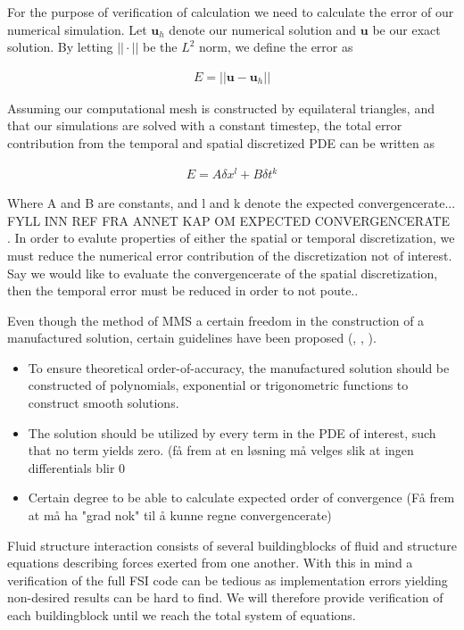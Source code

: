 For the purpose of verification of calculation we need to calculate the error of our numerical simulation. Let $\mathbf{u}_h$ denote our numerical solution and $\mathbf{u}$ be our exact solution. By letting $|| \cdot || $ be the  $L^2$ norm, we define the error as

\begin{align*}
E = ||\mathbf{u} - \mathbf{u}_h  ||
\end{align*}

Assuming our computational mesh is constructed by equilateral triangles, and that our simulations are solved with a constant timestep, the total error contribution from the temporal and spatial 
discretized PDE can be written as

\begin{align*}
E = A \delta x^l + B \delta t^k
\end{align*}


Where A and B are constants, and l and k denote the expected convergencerate... FYLL INN REF FRA ANNET KAP OM EXPECTED CONVERGENCERATE \\. In order to evalute properties of either the spatial or temporal discretization, we must reduce the numerical error contribution of the discretization not of interest. Say we would like to evaluate the convergencerate of the spatial discretization, then the temporal error must be reduced in order to not poute.. 

Even though the method of MMS a certain freedom in the construction of a manufactured solution, certain guidelines have been proposed  (\cite{Steinberg1985}, \cite{Biggs}, \cite{Roache2002} ). 

\begin{itemize}
\item To ensure theoretical order-of-accuracy, the manufactured solution should be constructed of polynomials, exponential or trigonometric functions to construct smooth solutions.
\item The solution should be utilized by every term in the PDE of interest, such that no term yields zero.
(få frem at en løsning må velges slik at ingen differentials blir 0
\item Certain degree to be able to calculate expected order of convergence (Få frem at må ha "grad nok" til å kunne regne convergencerate) 
\end{itemize}

Fluid structure interaction consists of several buildingblocks of fluid and structure equations describing forces exerted from one another. With this in mind a verification of the full FSI code can be tedious as implementation errors yielding non-desired results can be hard to find. We will therefore provide verification of each buildingblock until we reach the total system of equations. \\

